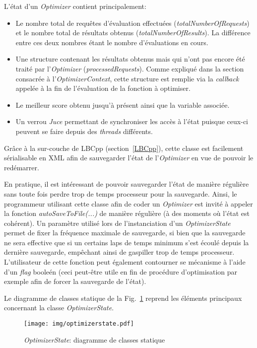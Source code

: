 \documentclass[a4paper, 11pt]{report}
\begin{document}
L'état d'un \textit{Optimizer} contient principalement:
\begin{itemize}
\item Le nombre total de requêtes d'évaluation effectuées (\textit{totalNumberOfRequests}) et le nombre total de résultats obtenus (\textit{totalNumberOfResults}). La différence entre ces deux nombres étant le nombre d'évaluations en cours.
\item Une structure contenant les résultats obtenus mais qui n'ont pas encore été traité par l'\textit{Optimizer} (\textit{processedRequests}). Comme expliqué dans la section consacrée à l'\textit{OptimizerContext}, cette structure est remplie via la \textit{callback} appelée à la fin de l'évaluation de la fonction à optimiser.
\item Le meilleur score obtenu jusqu'à présent ainsi que la variable associée.
\item Un verrou \textit{Juce} permettant de synchroniser les accès à l'état puisque ceux-ci peuvent se faire depuis des \textit{threads} différents.
\end{itemize}

Grâce à la sur-couche de LBCpp (section~\ref{LBCpp}), cette classe est facilement sérialisable en XML afin de sauvegarder l'état de l'\textit{Optimizer} en vue de pouvoir le redémarrer. 

En pratique, il est intéressant de pouvoir sauvegarder l'état de manière régulière sans toute fois perdre trop de temps processeur pour la sauvegarde. Ainsi, le programmeur utilisant cette classe afin de coder un \textit{Optimizer} est invité à appeler la fonction \textit{autoSaveToFile(...)} de manière régulière (à des moments où l'état est cohérent). Un paramètre utilisé lors de l'instanciation d'un \textit{OptimizerState} permet de fixer la fréquence maximale de sauvegarde, si bien que la sauvegarde ne sera effective que si un certains laps de temps minimum s'est écoulé depuis la dernière sauvegarde, empêchant ainsi de gaspiller trop de temps processeur. L'utilisateur de cette fonction peut également contourner se mécanisme à l'aide d'un \textit{flag} booleén (ceci peut-être utile en fin de procédure d'optimisation par exemple afin de forcer la sauvegarde de l'état). 

Le diagramme de classes statique de la Fig.~\ref{optimizerstate} reprend les éléments principaux concernant la classe \textit{OptimizerState}.

\begin{figure}[!h]
\centering
\texttt{[image: img/optimizerstate.pdf]}
\caption{\textit{OptimizerState}: diagramme de classes statique}
\label{optimizerstate}
\end{figure}
\end{document}
